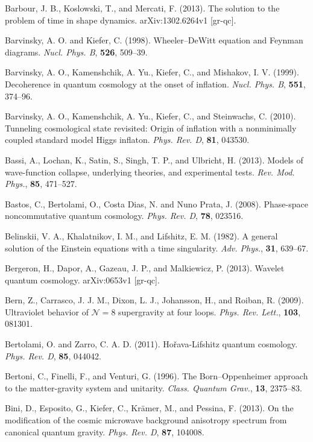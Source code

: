\documentclass[12pt,a4paper]{article}
\begin{document}
\bibitem{} Barbour, J. B., Koslowski, T., and Mercati, F. (2013).
The solution to the problem of time in shape dynamics.
arXiv:1302.6264v1 [gr-qc].

\bibitem{} Barvinsky, A. O. and Kiefer, C. (1998). Wheeler--DeWitt equation
           and Feynman diagrams. {\em Nucl. Phys. B}, {\bf 526},
           509--39.

\bibitem{} Barvinsky, A. O., Kamenshchik, A. Yu., Kiefer, C., and
           Mishakov, I. V. (1999). Decoherence in quantum cosmology
           at the onset of inflation. {\em Nucl. Phys. B}, {\bf 551},
           374--96.

\bibitem{} Barvinsky, A. O., Kamenshchik, A. Yu., Kiefer, C.,
           and Steinwachs, C. (2010).
           Tunneling cosmological state revisited: Origin of inflation
           with a nonminimally coupled standard model Higgs inflaton. 
           {\em Phys. Rev. D}, {\bf 81}, 043530.

\bibitem{} Bassi, A., Lochan, K., Satin, S., Singh, T. P., and
  Ulbricht, H. (2013). Models of wave-function collapse, underlying
  theories, and experimental tests. {\em Rev. Mod. Phys.}, {\bf 85},
  471--527. 

\bibitem{} Bastos, C., Bertolami, O., Costa Dias, N. and Nuno Prata,
  J. (2008). Phase-space noncommutative quantum cosmology.
{\em Phys. Rev. D}, {\bf 78}, 023516.

\bibitem{} Belinskii, V. A., Khalatnikov, I. M., and Lifshitz, E. M. (1982).
           A general solution of the Einstein equations with a time
           singularity. {\em Adv. Phys.}, {\bf 31}, 639--67.

\bibitem{} Bergeron, H., Dapor, A., Gazeau, J. P., and Malkiewicz, P. (2013).
           Wavelet quantum cosmology. arXiv:0653v1 [gr-qc].

\bibitem{} Bern, Z., Carrasco, J. J. M., Dixon, L. J., Johansson, H.,
           and Roiban, R. (2009). Ultraviolet behavior of ${\mathcal
           N}=8$ supergravity at four loops. {\em Phys. Rev. Lett.},
           {\bf 103}, 081301.

\bibitem{} Bertolami, O. and Zarro, C. A. D. (2011). 
          Ho\v{r}ava-Lifshitz quantum cosmology.
          {\em Phys. Rev. D}, {\bf 85}, 044042.

\bibitem{} Bertoni, C., Finelli, F., and Venturi, G. (1996). The
           Born--Oppenheimer approach to the matter-gravity system and 
           unitarity. {\em Class. Quantum Grav.}, {\bf 13}, 2375--83.

\bibitem{} Bini, D., Esposito, G., Kiefer, C., Kr\"amer, M., and Pessina, F.
  (2013). On the modification of the cosmic microwave background
  anisotropy spectrum from canonical quantum gravity. 
 {\em Phys. Rev. D}, {\bf 87}, 104008.
\end{document}
